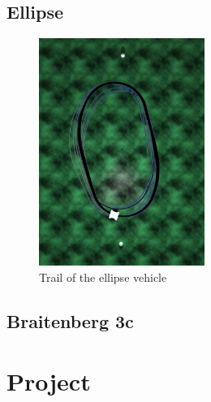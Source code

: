 \documentclass[a4paper]{article}
\begin{document}
\subsection{Ellipse}
\begin{figure}
	\begin{center}
		\includegraphics[width=0.48\textwidth]{trail/ellipse.png}
	\end{center}
	\caption{Trail of the ellipse vehicle}
\end{figure}

\subsection{Braitenberg 3c}

\cleardoublepage
\section{Project}
\end{document}
